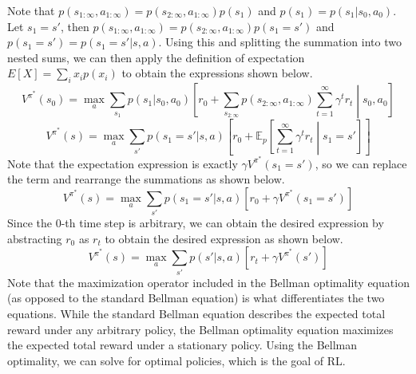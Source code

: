 \documentclass[11pt]{article}
\begin{document}
Note that $p(s_{1:\infty},a_{1:\infty}) = p(s_{2:\infty},a_{1:\infty})p(s_{1})$ and $p(s_{1}) = p(s_{1}|s_0, a_0)$. Let $s_1 = s'$, then $p(s_{1:\infty},a_{1:\infty}) = p(s_{2:\infty},a_{1:\infty})p(s_{1} = s')$ and $p(s_{1} = s') = p(s_{1} = s'|s, a)$. Using this and splitting the summation into two nested sums, we can then apply the definition of expectation $E[X] = \sum_i x_ip(x_i)$ to obtain the expressions shown below.
\[ V^{\pi^*}(s_0) = \max_a \sum_{s_{1}} p(s_{1}|s_0, a_{0}) \left[r_0 + \sum_{s_{2:\infty}} p(s_{2:\infty},a_{1:\infty})\sum_{t=1}^\infty \gamma^tr_t\middle|s_0, a_0 \right] \]
\[ V^{\pi^*}(s) = \max_a \sum_{s'} p(s_{1} = s'|s, a) \left[r_0 + \mathds{E}_p\left[\sum_{t=1}^\infty \gamma^tr_t\middle|s_1 = s' \right] \right] \]
Note that the expectation expression is exactly $\gamma V^{\pi^*}(s_1 = s')$, so we can replace the term and rearrange the summations as shown below.
\[ V^{\pi^*}(s) = \max_a \sum_{s'} p(s_{1} = s'|s, a) \left[r_0 + \gamma V^{\pi^*}(s_1 = s') \right] \]
Since the 0-th time step is arbitrary, we can obtain the desired expression by abstracting $r_0$ as $r_t$ to obtain the desired expression as shown below.
\[ V^{\pi^*}(s) = \max_a \sum_{s'} p(s'|s, a) \left[r_t + \gamma V^{\pi^*}(s') \right] \]
Note that the maximization operator included in the Bellman optimality equation (as opposed to the standard Bellman equation) is what differentiates the two equations. While the standard Bellman equation describes the expected total reward under any arbitrary policy, the Bellman optimality equation maximizes the expected total reward under a stationary policy. Using the Bellman optimality, we can solve for optimal policies, which is the goal of RL.
\end{document}
